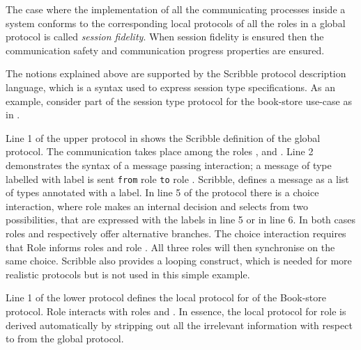 The case where the implementation of all the communicating
processes inside a system conforms to the corresponding
local protocols of all the roles in a global protocol
is called {\em session fidelity}.
When session fidelity is ensured then the communication safety
and communication progress properties are ensured.


\label{sec:scribble}
The notions explained above are supported by the
Scribble protocol description language,
which is a syntax used to express session type specifications.
As an example,
consider part of the session type protocol for the book-store
use-case as in .




Line 1 of the upper protocol in  shows the
Scribble definition of the global protocol.
The communication takes place
among the roles \BuyerOne, \BuyerTwo and \Seller. Line 2 demonstrates
the syntax of a message passing interaction; a message
of type  labelled with label  is sent \lstinline[basicstyle=\normalsize\ttfamily]|from|
role \BuyerOne \lstinline[basicstyle=\normalsize\ttfamily]|to| role \Seller. Scribble, defines a message 
as a list of types annotated with a label.
%
In line 5 of the protocol
there is a choice interaction,
where role \BuyerTwo makes an internal decision and selects
from two possibilities, that are
expressed with the labels  in line 5 or  in line 6.
In  both cases roles \BuyerOne and \Seller respectively offer
alternative branches. The choice interaction requires that
Role \BuyerTwo informs roles \BuyerOne and role \Seller. All
three roles will then synchronise on the same choice.
%
Scribble also provides a looping construct, which is needed for more realistic
protocols but is not used in this simple example.


Line 1 of the lower protocol defines the local protocol
for \BuyerOne of the Book-store protocol. Role \BuyerOne
interacts with roles \BuyerTwo and \Seller. In essence,
the local protocol for role \BuyerOne is derived automatically
by stripping out all the irrelevant information with respect
to \BuyerOne from the global protocol.



